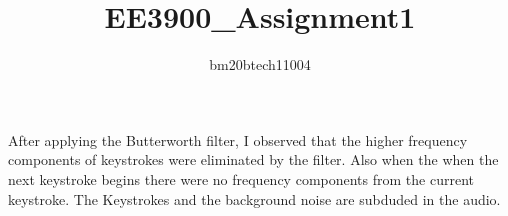 \documentclass{article}
\title{EE3900_Assignment1}
\author{bm20btech11004 }
\begin{document}
\Large
   After applying the Butterworth filter, I observed that the higher frequency components of keystrokes were eliminated by the filter. Also when the when the next keystroke begins there were no frequency components from the current keystroke. The Keystrokes and the background noise are subduded in the audio.
\end{document}
